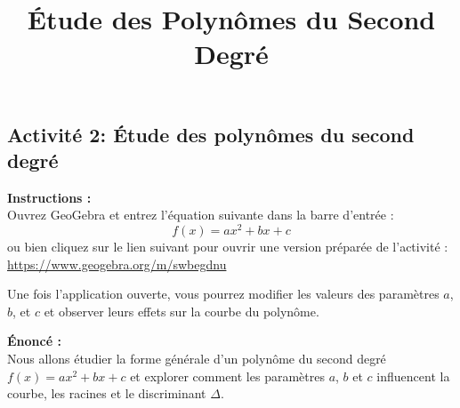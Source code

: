 \documentclass{article}
\title{Étude des Polynômes du Second Degré}
\author{}
\date{}
\begin{document}
\begin{center}
\section*{Activité 2: Étude des polynômes du second degré}
\end{center}
\bigskip
\bigskip

\noindent
\textbf{Instructions :} \\
Ouvrez GeoGebra et entrez l'équation suivante dans la barre d'entrée :
\[
f(x) = ax^2 + bx + c
\]
ou bien cliquez sur le lien suivant pour ouvrir une version préparée de l'activité :
\href{https://www.geogebra.org/m/swbegdnu}{https://www.geogebra.org/m/swbegdnu}

\bigskip
Une fois l'application ouverte, vous pourrez modifier les valeurs des paramètres $a$, $b$, et $c$ et observer leurs effets sur la courbe du polynôme.

\bigskip
\noindent
\textbf{Énoncé :} \\
Nous allons étudier la forme générale d'un polynôme du second degré $f(x) = ax^2 + bx + c$ et explorer comment les paramètres $a$, $b$ et $c$ influencent la courbe, les racines et le discriminant $\Delta$.
\end{document}
